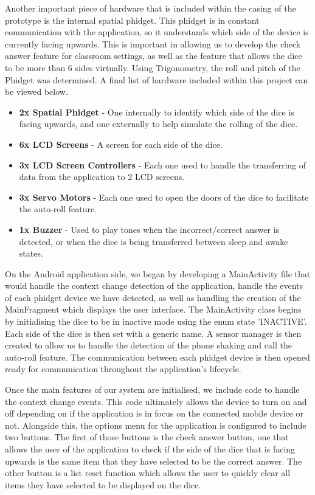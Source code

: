 \documentclass{sigchi}
\begin{document}
  

Another important piece of hardware that is included within the casing of the prototype is the internal spatial phidget. This phidget is in constant communication with the application, so it understands which side of the device is currently facing upwards. This is important in allowing us to develop the check answer feature for classroom settings, as well as the feature that allows the dice to be more than 6 sides virtually. Using Trigonometry, the roll and pitch of the Phidget was determined. A final list of hardware included within this project can be viewed below.

\begin{itemize}
    \item \textbf{2x Spatial Phidget} - One internally to identify which side of the dice is facing upwards, and one externally to help simulate the rolling of the dice.
    \item \textbf{6x LCD Screens} - A screen for each side of the dice.
    \item \textbf{3x LCD Screen Controllers} - Each one used to handle the transferring of data from the application to 2 LCD screens.
    \item \textbf{3x Servo Motors} - Each one used to open the doors of the dice to facilitate the auto-roll feature.
    \item \textbf{1x Buzzer} - Used to play tones when the incorrect/correct answer is detected, or when the dice is being transferred between sleep and awake states.
  \end{itemize}

On the Android application side, we began by developing a MainActivity file that would handle the context change detection of the application, handle the events of each phidget device we have detected, as well as handling the creation of the MainFragment which displays the user interface. The MainActivity class begins by initialising the dice to be in inactive mode using the enum state 'INACTIVE'. Each side of the dice is then set with a generic name. A sensor manager is then created to allow us to handle the detection of the phone shaking and call the auto-roll feature. The communication between each phidget device is then opened ready for communication throughout the application's lifecycle. 

Once the main features of our system are initialised, we include code to handle the context change events. This code ultimately allows the device to turn on and off depending on if the application is in focus on the connected mobile device or not. Alongside this, the options menu for the application is configured to include two buttons. The first of those buttons is the check answer button, one that allows the user of the application to check if the side of the dice that is facing upwards is the same item that they have selected to be the correct answer. The other button is a list reset function which allows the user to quickly clear all items they have selected to be displayed on the dice.
\end{document}
